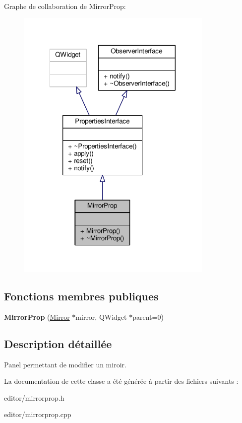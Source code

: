 Graphe de collaboration de Mirror\+Prop\+:\nopagebreak
\begin{figure}[H]
\begin{center}
\leavevmode
\includegraphics[width=269pt]{d3/d3c/classMirrorProp__coll__graph}
\end{center}
\end{figure}
\subsection*{Fonctions membres publiques}
\begin{DoxyCompactItemize}
\item 
\hypertarget{classMirrorProp_a66f3827e136a4de797881f58e3b2c2f5}{{\bfseries Mirror\+Prop} (\hyperlink{classMirror}{Mirror} $\ast$mirror, Q\+Widget $\ast$parent=0)}\label{classMirrorProp_a66f3827e136a4de797881f58e3b2c2f5}

\end{DoxyCompactItemize}


\subsection{Description détaillée}
Panel permettant de modifier un miroir. 

La documentation de cette classe a été générée à partir des fichiers suivants \+:\begin{DoxyCompactItemize}
\item 
editor/mirrorprop.\+h\item 
editor/mirrorprop.\+cpp\end{DoxyCompactItemize}
